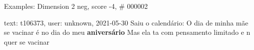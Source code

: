 \begin{frame}{Examples: Dimension 2 neg, score -4, \# 000002}
\footnotesize
\begin{alertblock}{text: t106373, user: unknown, 2021-05-30}
Saiu o calendário: O dia de minha mãe se vacinar é no dia do meu 
\textbf{aniversário} \textbf{} 
  Mas ela ta com 
pensamento limitado e n quer se vacinar   
  
\end{alertblock}
\end{frame}
